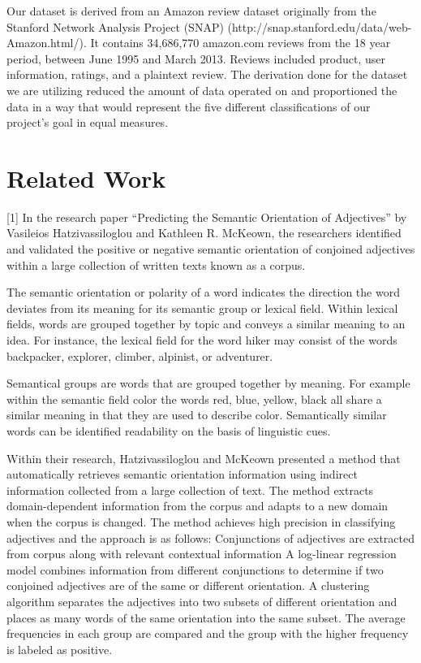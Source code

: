 \documentclass[conference]{IEEEtran}
\begin{document}
Our dataset is derived from an Amazon review dataset originally from the Stanford Network Analysis Project (SNAP) (http://snap.stanford.edu/data/web-Amazon.html/). It contains 34,686,770 amazon.com reviews from the 18 year period, between June 1995 and March 2013. Reviews included product, user information, ratings, and a plaintext review. The derivation done for the dataset we are utilizing reduced the amount of data operated on and proportioned the data in a way that would represent the five different classifications of our project’s goal in equal measures.


\section{Related Work}
[1] In the research paper “Predicting the Semantic Orientation of Adjectives” by Vasileios Hatzivassiloglou and Kathleen R. McKeown, the researchers identified and validated the positive or negative semantic orientation of conjoined adjectives within a large collection of written texts known as a corpus. 

The semantic orientation or polarity of a word indicates the direction the word deviates from its meaning for its semantic group or lexical field. Within lexical fields, words are grouped together by topic and conveys a similar meaning to an idea. For instance, the lexical field for the word hiker may consist of the words backpacker, explorer, climber, alpinist, or adventurer. 

Semantical groups are words that are grouped together by meaning. For example within the semantic field color the words red, blue, yellow, black all share a similar meaning in that they are used to describe color. Semantically similar words can be identified readability on the basis of linguistic cues. 

Within their research, Hatzivassiloglou and McKeown presented a method that automatically retrieves semantic orientation information using indirect information collected from a large collection of text. The method extracts domain-dependent information from the corpus and adapts to a new domain when the corpus is changed. The method achieves high precision in  classifying adjectives and the approach is as follows: 
Conjunctions of adjectives are extracted from corpus along with relevant contextual information
A log-linear regression model combines information from different conjunctions to determine if two conjoined adjectives are of the same or different orientation. 
A clustering algorithm separates the adjectives into two subsets of different orientation and places as many words of the same orientation into the same subset.
The average frequencies in each group are compared and the group with the higher frequency is labeled as positive. 
\end{document}
